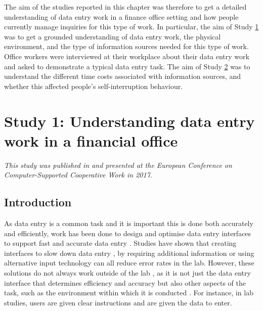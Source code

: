 The aim of the studies reported in this chapter was therefore to get a detailed understanding of data entry work in a finance office setting and how people currently manage inquiries for this type of work. In particular, the aim of Study \hyperref[st:Study1]{1} was to get a grounded understanding of data entry work, the physical environment, and the type of information sources needed for this type of work. Office workers were interviewed at their workplace about their data entry work and asked to demonstrate a typical data entry task. The aim of Study \hyperref[st:Study2]{2} was to understand the different time costs associated with information sources, and whether this affected people's self-interruption behaviour. %

\section{Study 1: Understanding data entry work in a financial office}\label{st:Study1}
 
\textit{This study was published in \citet{Borghouts2017} and presented at the European Conference on Computer-Supported Cooperative Work in 2017.}
 
\subsection{Introduction}
As data entry is a common task and it is important this is done both accurately and efficiently, work has been done to design and optimise data entry interfaces to support fast and accurate data entry \citep[e.g.][]{Oladimeji2013, Vertanen2015, Wiseman2013a}. Studies have shown that creating interfaces to slow down data entry \citep{Gould2016b}, by requiring additional information \citep{Wiseman2013a} or using alternative input technology \citep{Oladimeji2011} can all reduce error rates in the lab. However, these solutions do not always work outside of the lab \citep[e.g.][]{Gould2016b}, as it is not just the data entry interface that determines efficiency and accuracy but also other aspects of the task, such as the environment within which it is conducted \citep{Payne2013, Randall2014}. For instance, in lab studies, users are given clear instructions and are given the data to enter. 

